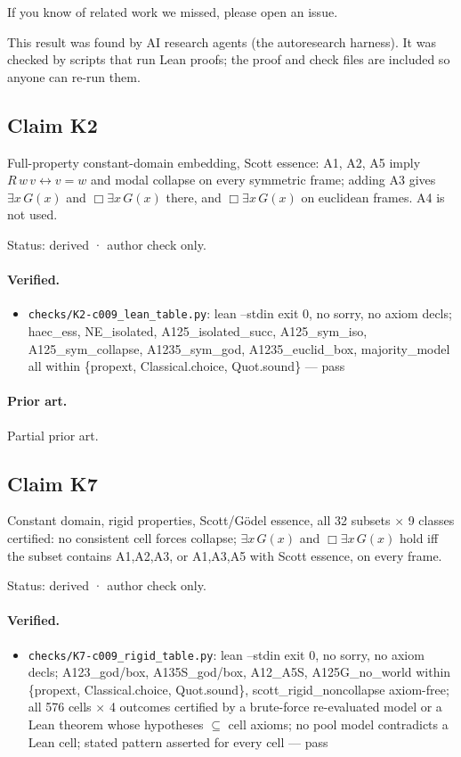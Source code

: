 \documentclass{article}
\begin{document}
If you know of related work we missed, please open an issue.

This result was found by AI research agents (the autoresearch harness). It was checked by scripts that run Lean proofs; the proof and check files are included so anyone can re-run them.

\subsection*{Claim K2}

Full-property constant-domain embedding, Scott essence: A1, A2, A5 imply $R\,w\,v \leftrightarrow v = w$ and modal collapse on every symmetric frame; adding A3 gives $\exists x\,G(x)$ and $\Box\exists x\,G(x)$ there, and $\Box\exists x\,G(x)$ on euclidean frames. A4 is not used.

Status: derived · author check only.

\paragraph{Verified.}
\begin{itemize}
\item \texttt{checks/K2-c009\_lean\_table.py}: lean --stdin exit 0, no sorry, no axiom decls; haec\_ess, NE\_isolated, A125\_isolated\_succ, A125\_sym\_iso, A125\_sym\_collapse, A1235\_sym\_god, A1235\_euclid\_box, majority\_model all within \{propext, Classical.choice, Quot.sound\} --- pass
\end{itemize}

\paragraph{Prior art.} Partial prior art.

\subsection*{Claim K7}

Constant domain, rigid properties, Scott/Gödel essence, all 32 subsets $\times$ 9 classes certified: no consistent cell forces collapse; $\exists x\,G(x)$ and $\Box\exists x\,G(x)$ hold iff the subset contains A1,A2,A3, or A1,A3,A5 with Scott essence, on every frame.

Status: derived · author check only.

\paragraph{Verified.}
\begin{itemize}
\item \texttt{checks/K7-c009\_rigid\_table.py}: lean --stdin exit 0, no sorry, no axiom decls; A123\_god/box, A135S\_god/box, A12\_A5S, A125G\_no\_world within \{propext, Classical.choice, Quot.sound\}, scott\_rigid\_noncollapse axiom-free; all 576 cells $\times$ 4 outcomes certified by a brute-force re-evaluated model or a Lean theorem whose hypotheses $\subseteq$ cell axioms; no pool model contradicts a Lean cell; stated pattern asserted for every cell --- pass
\end{itemize}
\end{document}
